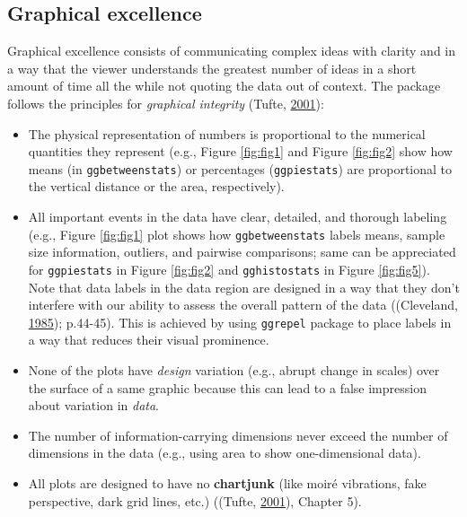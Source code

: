 \documentclass[]{article}
\begin{document}
\hypertarget{graphical-excellence}{%
\subsection{Graphical excellence}\label{graphical-excellence}}

Graphical excellence consists of communicating complex ideas with clarity and in
a way that the viewer understands the greatest number of ideas in a short amount
of time all the while not quoting the data out of context. The package follows
the principles for \emph{graphical integrity} (Tufte, \protect\hyperlink{ref-tufteVisualDisplayQuantitative2001}{2001}):

\begin{itemize}
\item
  The physical representation of numbers is proportional to the numerical
  quantities they represent (e.g., Figure \ref{fig:fig1} and Figure
  \ref{fig:fig2} show how means (in \texttt{ggbetweenstats}) or percentages
  (\texttt{ggpiestats}) are proportional to the vertical distance or the area,
  respectively).
\item
  All important events in the data have clear, detailed, and thorough labeling
  (e.g., Figure \ref{fig:fig1} plot shows how \texttt{ggbetweenstats} labels means,
  sample size information, outliers, and pairwise comparisons; same can be
  appreciated for \texttt{ggpiestats} in Figure \ref{fig:fig2} and \texttt{gghistostats} in
  Figure \ref{fig:fig5}). Note that data labels in the data region are
  designed in a way that they don't interfere with our ability to assess the
  overall pattern of the data ((Cleveland, \protect\hyperlink{ref-clevelandElementsGraphingData1985}{1985});
  p.44-45). This is achieved by using \texttt{ggrepel} package to place labels in a
  way that reduces their visual prominence.
\item
  None of the plots have \emph{design} variation (e.g., abrupt change in scales)
  over the surface of a same graphic because this can lead to a false
  impression about variation in \emph{data}.
\item
  The number of information-carrying dimensions never exceed the number of
  dimensions in the data (e.g., using area to show one-dimensional data).
\item
  All plots are designed to have no \textbf{chartjunk} (like moiré vibrations, fake
  perspective, dark grid lines, etc.)
  ((Tufte, \protect\hyperlink{ref-tufteVisualDisplayQuantitative2001}{2001}), Chapter 5).
\end{itemize}
\end{document}
